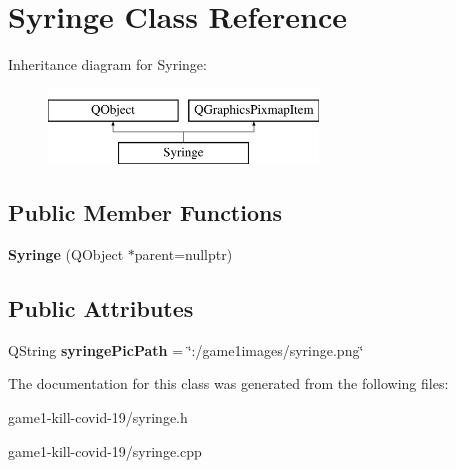 \hypertarget{classSyringe}{\section{Syringe Class Reference}
\label{classSyringe}
}
Inheritance diagram for Syringe\-:\begin{figure}[H]
\begin{center}
\leavevmode
\includegraphics[height=2.000000cm]{classSyringe}
\end{center}
\end{figure}
\subsection*{Public Member Functions}
\begin{DoxyCompactItemize}
\item 
\hypertarget{classSyringe_a23cd14bbda9d49bf21a66f6606a7baab}{{\bfseries Syringe} (Q\-Object $\ast$parent=nullptr)}\label{classSyringe_a23cd14bbda9d49bf21a66f6606a7baab}

\end{DoxyCompactItemize}
\subsection*{Public Attributes}
\begin{DoxyCompactItemize}
\item 
\hypertarget{classSyringe_a4408fc94be7fab5785d86afde994d7d0}{Q\-String {\bfseries syringe\-Pic\-Path} = \char`\"{}\-:/game1images/syringe.\-png\char`\"{}}\label{classSyringe_a4408fc94be7fab5785d86afde994d7d0}

\end{DoxyCompactItemize}


The documentation for this class was generated from the following files\-:\begin{DoxyCompactItemize}
\item 
game1-\/kill-\/covid-\/19/syringe.\-h\item 
game1-\/kill-\/covid-\/19/syringe.\-cpp\end{DoxyCompactItemize}
